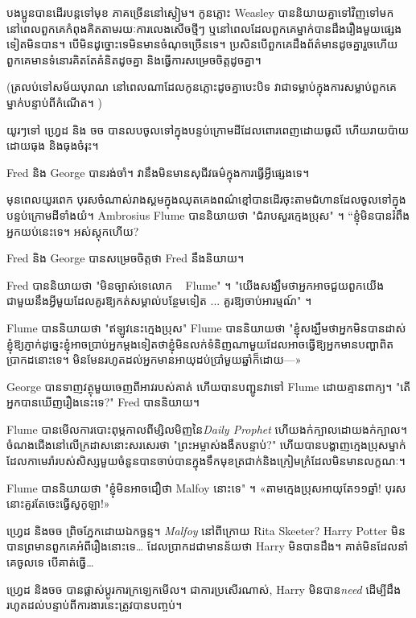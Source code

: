 {បងប្អូន​បាន​ដើរ​បន្ត​ទៅ​មុខ ភាគច្រើន​នៅ​ស្ងៀម។ កូនភ្លោះ Weasley បាន​និយាយ​គ្នា​ទៅវិញទៅមក នៅពេល​ពួកគេ​កំពុង​គិត​តាមរយៈ​ការលេងសើច​ថ្មីៗ ឬ​នៅពេលដែល​ពួកគេ​ម្នាក់​បានដឹង​រឿង​មួយ​ផ្សេងទៀត​មិនបាន។ បើមិនដូច្នោះទេមិនមានចំណុចច្រើនទេ។ ប្រសិនបើពួកគេដឹងព័ត៌មានដូចគ្នារួចហើយ ពួកគេមានទំនោរគិតតែគំនិតដូចគ្នា និងធ្វើការសម្រេចចិត្តដូចគ្នា។

(ត្រលប់ទៅសម័យបុរាណ នៅពេលណាដែលកូនភ្លោះដូចគ្នាបេះបិទ វាជាទម្លាប់ក្នុងការសម្លាប់ពួកគេម្នាក់បន្ទាប់ពីកំណើត។ )

យូរៗទៅ ហ្វ្រេដ និង ចច បានលបចូលទៅក្នុងបន្ទប់ក្រោមដីដែលពោរពេញដោយធូលី ហើយរាយប៉ាយដោយធុង និងធុងចំរុះ។

Fred និង George បានរង់ចាំ។ វានឹងមិនមានសុជីវធម៌ក្នុងការធ្វើអ្វីផ្សេងទេ។

មុន​ពេល​យូរ​ពេក បុរស​ចំណាស់​រាង​ស្គម​ក្នុង​ឈុត​គេង​ពណ៌​ខ្មៅ​បាន​ដើរ​ចុះ​តាម​ជំហាន​ដែល​ចូល​ទៅ​ក្នុង​បន្ទប់​ក្រោមដី​ទាំង​យំ។ Ambrosius Flume បាននិយាយថា "ជំរាបសួរក្មេងប្រុស" ។ “ខ្ញុំមិនបានរំពឹងអ្នកយប់នេះទេ។ អស់ស្តុកហើយ?

Fred និង George បានសម្រេចចិត្តថា Fred នឹងនិយាយ។

Fred បាននិយាយថា "មិនច្បាស់ទេលោក ~ Flume" ។ "យើងសង្ឃឹមថាអ្នកអាចជួយពួកយើងជាមួយនឹងអ្វីមួយដែលគួរឱ្យកត់សម្គាល់បន្ថែមទៀត ... គួរឱ្យចាប់អារម្មណ៍" ។

Flume បាននិយាយថា "ឥឡូវនេះក្មេងប្រុស" Flume បាននិយាយថា "ខ្ញុំសង្ឃឹមថាអ្នកមិនបានដាស់ខ្ញុំឱ្យភ្ញាក់ដូច្នេះខ្ញុំអាចប្រាប់អ្នកម្តងទៀតថាខ្ញុំមិនលក់ទំនិញណាមួយដែលអាចធ្វើឱ្យអ្នកមានបញ្ហាពិតប្រាកដនោះទេ។ មិន​មែន​រហូត​ដល់​អ្នក​មាន​អាយុ​ដប់ប្រាំ​មួយ​ឆ្នាំ​ក៏​ដោយ—»

George បានទាញវត្ថុមួយចេញពីអាវរបស់គាត់ ហើយបានបញ្ជូនវាទៅ Flume ដោយគ្មានពាក្យ។ "តើអ្នកបានឃើញរឿងនេះទេ?" Fred បាននិយាយ។

Flume បានមើលការបោះពុម្ភកាលពីម្សិលមិញនៃ\emph{Daily Prophet} ហើយងក់ក្បាលដោយងក់ក្បាល។ ចំណងជើងនៅលើក្រដាសនោះសរសេរថា "ព្រះអម្ចាស់ងងឹតបន្ទាប់?" ហើយ​បាន​បង្ហាញ​ក្មេង​ប្រុស​ម្នាក់​ដែល​កាមេរ៉ា​របស់​សិស្ស​មួយ​ចំនួន​បាន​ចាប់​បាន​ក្នុង​ទឹក​មុខ​ត្រជាក់​និង​ក្រៀមក្រំ​ដែល​មិន​មាន​លក្ខណៈ។

Flume បាននិយាយថា "ខ្ញុំមិនអាចជឿថា Malfoy នោះទេ" ។ «តាម​ក្មេង​ប្រុស​អាយុ​តែ​១១​ឆ្នាំ! បុរស​នោះ​គួរ​តែ​ចេះ​ធ្វើ​សូកូឡា​!»

ហ្វ្រេដ និងចច ព្រិចភ្នែកដោយឯកច្ឆន្ទ។ \emph{Malfoy} នៅពីក្រោយ Rita Skeeter? Harry Potter មិន​បាន​ព្រមាន​ពួក​គេ​អំពី​រឿង​នោះ​ទេ… ដែល​ប្រាកដ​ជា​មាន​ន័យ​ថា Harry មិន​បាន​ដឹង។ គាត់​មិន​ដែល​នាំ​គេ​ចូល​ទេ បើ​គាត់​ធ្វើ…

ហ្វ្រេដ និងចច បានផ្លាស់ប្តូរការក្រឡេកមើល។ ជាការប្រសើរណាស់, Harry មិនបាន\emph{need} ដើម្បីដឹងរហូតដល់បន្ទាប់ពីការងារនេះត្រូវបានបញ្ចប់។

}
